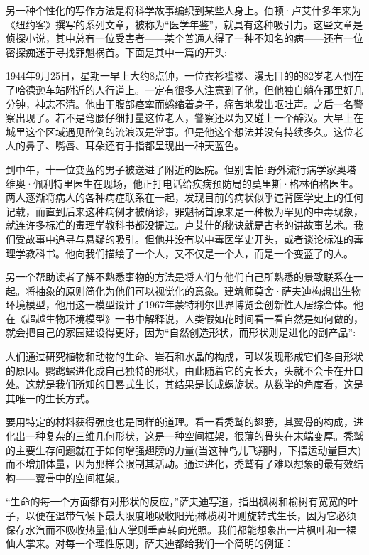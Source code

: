 另一种个性化的写作方法是将科学故事编织到某些人身上。伯顿·卢艾什多年来为《纽约客》撰写的系列文章，被称为“医学年鉴”，就具有这种吸引力。这些文章是侦探小说，其中总有一位受害者——某个普通人得了一种不知名的病——还有一位密探痴迷于寻找罪魁祸首。下面是其中一篇的开头:

1944年9月25日，星期一早上大约8点钟，一位衣衫褴褛、漫无目的的82岁老人倒在了哈德逊车站附近的人行道上。一定有很多人注意到了他，但他独自躺在那里好几分钟，神志不清。他由于腹部痉挛而蜷缩着身子，痛苦地发出呕吐声。之后一名警察出现了。若不是弯腰仔细打量这位老人，警察还以为又碰上一个醉汉。大早上在城里这个区域遇见醉倒的流浪汉是常事。但是他这个想法并没有持续多久。这位老人的鼻子、嘴唇、耳朵还有手指都呈现出一种天蓝色。

到中午，十一位变蓝的男子被送进了附近的医院。但别害怕:野外流行病学家奥塔维奥·佩利特里医生在现场，他正打电话给疾病预防局的莫里斯·格林伯格医生。两人逐渐将病人的各种病症联系在一起，发现目前的病状似乎违背医学史上的任何记载，而直到后来这种病例才被确诊，罪魁祸首原来是一种极为罕见的中毒现象，就连许多标准的毒理学教科书都没提过。卢艾什的秘诀就是古老的讲故事艺术。我们受故事中追寻与悬疑的吸引。但他并没有以中毒医学史开头，或者谈论标准的毒理学教科书。他向我们描绘了一个人，又不仅是一个人，而是一个变蓝了的人。

另一个帮助读者了解不熟悉事物的方法是将人们与他们自己所熟悉的景致联系在一起。将抽象的原则简化为他们可以视觉化的意象。建筑师莫舍·萨夫迪构想出生物环境模型，他用这一模型设计了1967年蒙特利尔世界博览会创新性人居综合体。他在《超越生物环境模型》一书中解释说，人类假如花时间看一看自然是如何做的，就会把自己的家园建设得更好，因为“自然创造形状，而形状则是进化的副产品”:

人们通过研究植物和动物的生命、岩石和水晶的构成，可以发现形成它们各自形状的原因。鹦鹉螺进化成自己独特的形状，由此随着它的壳长大，头就不会卡在开口处。这就是我们所知的日晷式生长，其结果是长成螺旋状。从数学的角度看，这是其唯一的生长方式。

要用特定的材料获得强度也是同样的道理。看一看秃鹫的翅膀，其翼骨的构成，进化出一种复杂的三维几何形状，这是一种空间框架，很薄的骨头在末端变厚。秃鹫的主要生存问题就在于如何增强翅膀的力量(当这种鸟儿飞翔时，下摆运动量巨大)而不增加体量，因为那样会限制其活动。通过进化，秃鹫有了难以想象的最有效结构——翼骨中的空间框架。

“生命的每一个方面都有对形状的反应，”萨夫迪写道，指出枫树和榆树有宽宽的叶子，以便在温带气候下最大限度地吸收阳光;橄榄树叶则旋转式生长，因为它必须保存水汽而不吸收热量;仙人掌则垂直转向光照。我们都能想象出一片枫叶和一棵仙人掌来。对每一个理性原则，萨夫迪都给我们一个简明的例证：

